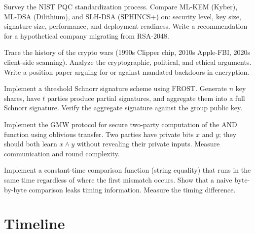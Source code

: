 \begin{exercise}[Research]
Survey the NIST PQC standardization process. Compare ML-KEM (Kyber), ML-DSA (Dilithium), and SLH-DSA (SPHINCS+) on: security level, key size, signature size, performance, and deployment readiness. Write a recommendation for a hypothetical company migrating from RSA-2048.
\end{exercise}

\begin{exercise}[Research]
Trace the history of the crypto wars (1990s Clipper chip, 2010s Apple-FBI, 2020s client-side scanning). Analyze the cryptographic, political, and ethical arguments. Write a position paper arguing for or against mandated backdoors in encryption.
\end{exercise}

\begin{exercise}[Challenge]
Implement a threshold Schnorr signature scheme using FROST. Generate $n$ key shares, have $t$ parties produce partial signatures, and aggregate them into a full Schnorr signature. Verify the aggregate signature against the group public key.
\end{exercise}

\begin{exercise}[Computational]
Implement the GMW protocol for secure two-party computation of the AND function using oblivious transfer. Two parties have private bits $x$ and $y$; they should both learn $x \land y$ without revealing their private inputs. Measure communication and round complexity.
\end{exercise}

\begin{exercise}[Intermediate]
Implement a constant-time comparison function (string equality) that runs in the same time regardless of where the first mismatch occurs. Show that a naive byte-by-byte comparison leaks timing information. Measure the timing difference.
\end{exercise}


\section{Timeline}
\label{sec:crypto:timeline}

